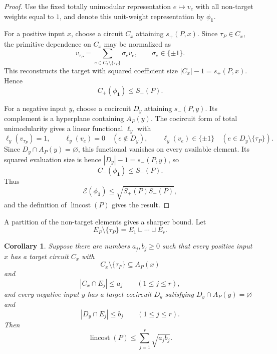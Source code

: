 \documentclass[11pt]{article}
\numberwithin{equation}{section}
\newtheorem{corollary}[definition]{Corollary}
\theoremstyle{remark}
\begin{document}
\begin{proof}
Use the fixed totally unimodular representation $e\mapsto v_e$ with all
non-target weights equal to $1$, and denote this unit-weight representation by
$\phi_{\mathbf 1}$.

For a positive input $x$, choose a circuit $C_x$ attaining
$s_+(P,x)$. Since $\tau_P\in C_x$, the primitive dependence on $C_x$ may
be normalized as
\begin{equation}
    v_{\tau_P}
    =
    \sum_{e\in C_x\setminus\{\tau_P\}}
        \sigma_e v_e,
    \qquad
    \sigma_e\in\{\pm1\}.
\end{equation}
This reconstructs the target with squared coefficient size
$|C_x|-1=s_+(P,x)$. Hence
\begin{equation}
    C_+(\phi_{\mathbf 1})\leq S_+(P).
\end{equation}

For a negative input $y$, choose a cocircuit $D_y$ attaining
$s_-(P,y)$. Its complement is a hyperplane containing $A_P(y)$. The
cocircuit form of total unimodularity gives a linear functional $\ell_y$
with
\begin{equation}
    \ell_y(v_{\tau_P})=1,
    \qquad
    \ell_y(v_e)=0\quad(e\notin D_y),
    \qquad
    \ell_y(v_e)\in\{\pm1\}\quad(e\in D_y\setminus\{\tau_P\}).
\end{equation}
Since $D_y\cap A_P(y)=\varnothing$, this functional vanishes on every
available element. Its squared evaluation size is hence
$|D_y|-1=s_-(P,y)$, so
\begin{equation}
    C_-(\phi_{\mathbf 1})\leq S_-(P).
\end{equation}
Thus
\begin{equation}
    \mathcal E(\phi_{\mathbf 1})
    \leq
    \sqrt{S_+(P)S_-(P)},
\end{equation}
and the definition of $\operatorname{lincost}(P)$ gives the result.
\end{proof}

A partition of the non-target elements gives a sharper bound. Let
\begin{equation}
    E_P\setminus\{\tau_P\}
    =
    E_1\sqcup\cdots\sqcup E_r.
\end{equation}

\begin{corollary}
\label{cor:regular-typed-support-bound}
Suppose there are numbers $a_j,b_j\geq0$ such that every positive input
$x$ has a target circuit $C_x$ with
\begin{equation}
    C_x\setminus\{\tau_P\}\subseteq A_P(x)
\end{equation}
and
\begin{equation}
    |C_x\cap E_j|\leq a_j
    \qquad(1\leq j\leq r),
\end{equation}
and every negative input $y$ has a target cocircuit $D_y$ satisfying
$D_y\cap A_P(y)=\varnothing$ and
\begin{equation}
    |D_y\cap E_j|\leq b_j
    \qquad(1\leq j\leq r).
\end{equation}
Then
\begin{equation}
    \operatorname{lincost}(P)
    \leq
    \sum_{j=1}^r\sqrt{a_jb_j}.
\end{equation}
\end{corollary}
\end{document}
